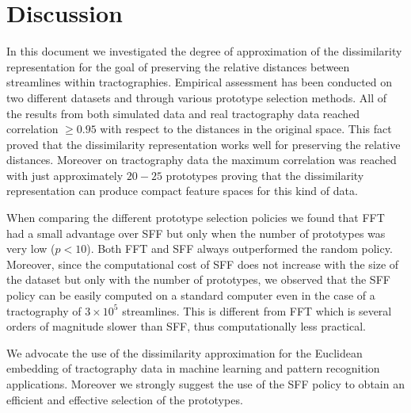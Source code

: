 \section{Discussion}
\label{sec:discussion}
In this document we investigated the degree of approximation of the
dissimilarity representation for the goal of preserving the relative
distances between streamlines within tractographies. Empirical
assessment has been conducted on two different datasets and through
various prototype selection methods. All of the results from both
simulated data and real tractography data reached correlation $\ge
0.95$ with respect to the distances in the original space. This fact
proved that the dissimilarity representation works well for preserving
the relative distances. Moreover on tractography data the maximum correlation
was reached with just approximately $20-25$ prototypes proving that
the dissimilarity representation can produce compact feature spaces
for this kind of data.

When comparing the different prototype selection policies we found
that FFT had a small advantage over SFF but only when the number of
prototypes was very low ($p<10$). Both FFT and SFF always outperformed
the random policy. Moreover, since the computational cost of SFF does
not increase with the size of the dataset but only with the number of
prototypes, we observed that the SFF policy can be easily computed on
a standard computer even in the case of a tractography of $3\times
10^5$ streamlines. This is different from FFT which is several orders
of magnitude slower than SFF, thus computationally less practical.

We advocate the use of the dissimilarity approximation for the
Euclidean embedding of
tractography data in machine learning and pattern recognition
applications. Moreover we strongly suggest the use of the SFF policy
to obtain an efficient and effective selection of the prototypes.


